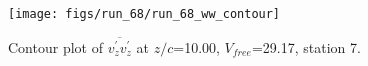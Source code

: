 \begin{figure}[H]
\centering
\texttt{[image: figs/run\_68/run\_68\_ww\_contour]}
\caption{Contour plot of $\overline{v_{z}^{\prime} v_{z}^{\prime}}$ at $z/c$=10.00, $V_{free}$=29.17, station 7.}
\label{fig:run_68_ww_contour}
\end{figure}


